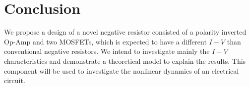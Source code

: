 \documentclass[12pt]{article}
\begin{document}
\section{Conclusion}


\quad We propose a design of a novel negative resistor consisted of a polarity inverted Op-Amp and two MOSFETs, which is expected to have a different \(I-V\) than conventional negative resistors. We intend to investigate mainly the \(I-V\) characteristics and demonstrate a theoretical model to explain the results. This component will be used to investigate the nonlinear dynamics of an electrical circuit.


\end{document}
